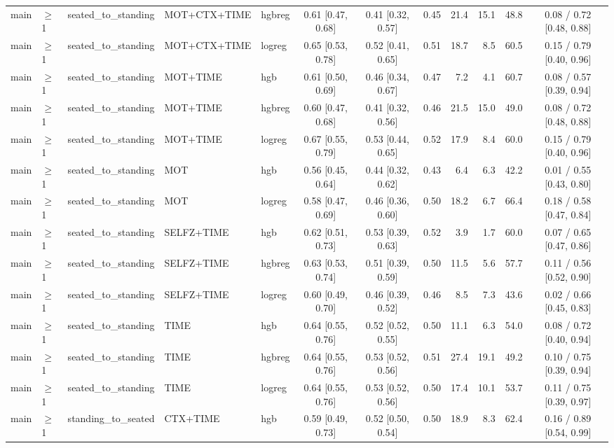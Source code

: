 \begin{longtable}{@{}lllllcccrrrc@{}}
main & $\geq$1 & seated\_to\_standing & MOT+CTX+TIME & hgbreg & 0.61 [0.47, 0.68] & 0.41 [0.32, 0.57] & 0.45 & 21.4 & 15.1 & 48.8 & 0.08 / 0.72 [0.48, 0.88] \\
main & $\geq$1 & seated\_to\_standing & MOT+CTX+TIME & logreg & 0.65 [0.53, 0.78] & 0.52 [0.41, 0.65] & 0.51 & 18.7 & 8.5 & 60.5 & 0.15 / 0.79 [0.40, 0.96] \\
main & $\geq$1 & seated\_to\_standing & MOT+TIME & hgb & 0.61 [0.50, 0.69] & 0.46 [0.34, 0.67] & 0.47 & 7.2 & 4.1 & 60.7 & 0.08 / 0.57 [0.39, 0.94] \\
main & $\geq$1 & seated\_to\_standing & MOT+TIME & hgbreg & 0.60 [0.47, 0.68] & 0.41 [0.32, 0.56] & 0.46 & 21.5 & 15.0 & 49.0 & 0.08 / 0.72 [0.48, 0.88] \\
main & $\geq$1 & seated\_to\_standing & MOT+TIME & logreg & 0.67 [0.55, 0.79] & 0.53 [0.44, 0.65] & 0.52 & 17.9 & 8.4 & 60.0 & 0.15 / 0.79 [0.40, 0.96] \\
main & $\geq$1 & seated\_to\_standing & MOT & hgb & 0.56 [0.45, 0.64] & 0.44 [0.32, 0.62] & 0.43 & 6.4 & 6.3 & 42.2 & 0.01 / 0.55 [0.43, 0.80] \\
main & $\geq$1 & seated\_to\_standing & MOT & logreg & 0.58 [0.47, 0.69] & 0.46 [0.36, 0.60] & 0.50 & 18.2 & 6.7 & 66.4 & 0.18 / 0.58 [0.47, 0.84] \\
main & $\geq$1 & seated\_to\_standing & SELFZ+TIME & hgb & 0.62 [0.51, 0.73] & 0.53 [0.39, 0.63] & 0.52 & 3.9 & 1.7 & 60.0 & 0.07 / 0.65 [0.47, 0.86] \\
main & $\geq$1 & seated\_to\_standing & SELFZ+TIME & hgbreg & 0.63 [0.53, 0.74] & 0.51 [0.39, 0.59] & 0.50 & 11.5 & 5.6 & 57.7 & 0.11 / 0.56 [0.52, 0.90] \\
main & $\geq$1 & seated\_to\_standing & SELFZ+TIME & logreg & 0.60 [0.49, 0.70] & 0.46 [0.39, 0.52] & 0.46 & 8.5 & 7.3 & 43.6 & 0.02 / 0.66 [0.45, 0.83] \\
main & $\geq$1 & seated\_to\_standing & TIME & hgb & 0.64 [0.55, 0.76] & 0.52 [0.52, 0.55] & 0.50 & 11.1 & 6.3 & 54.0 & 0.08 / 0.72 [0.40, 0.94] \\
main & $\geq$1 & seated\_to\_standing & TIME & hgbreg & 0.64 [0.55, 0.76] & 0.53 [0.52, 0.56] & 0.51 & 27.4 & 19.1 & 49.2 & 0.10 / 0.75 [0.39, 0.94] \\
main & $\geq$1 & seated\_to\_standing & TIME & logreg & 0.64 [0.55, 0.76] & 0.53 [0.52, 0.56] & 0.50 & 17.4 & 10.1 & 53.7 & 0.11 / 0.75 [0.39, 0.97] \\
main & $\geq$1 & standing\_to\_seated & CTX+TIME & hgb & 0.59 [0.49, 0.73] & 0.52 [0.50, 0.54] & 0.50 & 18.9 & 8.3 & 62.4 & 0.16 / 0.89 [0.54, 0.99] \\

\end{longtable}

